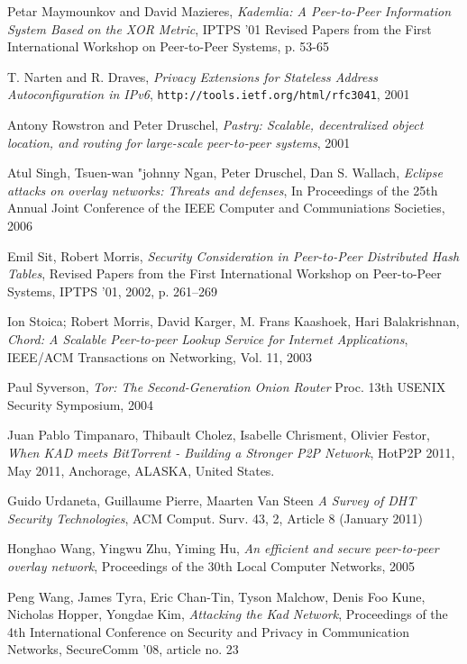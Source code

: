 \begin{thebibliography}{99}
  Petar Maymounkov and David Mazieres,
  \textit{Kademlia: A Peer-to-Peer Information System Based on the XOR Metric},
  IPTPS '01 Revised Papers from the First International Workshop on Peer-to-Peer
  Systems, p. 53-65

  T. Narten and R. Draves,
  \textit{Privacy Extensions for Stateless Address Autoconfiguration in IPv6},
  \texttt{http://tools.ietf.org/html/rfc3041},
  2001

  Antony Rowstron and Peter Druschel,
  \textit{Pastry: Scalable, decentralized object location, and routing for
  large-scale peer-to-peer systems}, 2001

  Atul Singh, Tsuen-wan "johnny Ngan, Peter Druschel, Dan S. Wallach,
  \textit{Eclipse attacks on overlay networks: Threats and defenses},
  In Proceedings of the 25th Annual Joint Conference of the IEEE Computer and
  Communiations Societies, 2006

  Emil Sit, Robert Morris,
  \textit{Security Consideration in Peer-to-Peer Distributed Hash Tables},
  Revised Papers from the First International Workshop on Peer-to-Peer Systems,
  IPTPS '01, 2002, p. 261--269

  Ion Stoica; Robert Morris, David Karger, M. Frans Kaashoek, Hari Balakrishnan,
  \textit{Chord: A Scalable Peer-to-peer Lookup Service for Internet
  Applications},
  IEEE/ACM Transactions on Networking, Vol. 11, 2003

  Paul Syverson,
  \textit{Tor: The Second-Generation Onion Router}
  Proc. 13th USENIX Security Symposium,
  2004

  Juan Pablo Timpanaro, Thibault Cholez, Isabelle Chrisment, Olivier Festor,
  \textit{When KAD meets BitTorrent - Building a Stronger P2P Network},
  HotP2P 2011, May 2011, Anchorage, ALASKA, United States.

 Guido Urdaneta, Guillaume Pierre, Maarten Van Steen
\textit{A Survey of DHT Security Technologies}, ACM Comput. Surv.  43, 2,
Article 8 (January 2011)

  Honghao Wang, Yingwu Zhu, Yiming Hu,
  \textit{An efficient and secure peer-to-peer overlay network}, 
  Proceedings of the 30th Local Computer Networks,
  2005

  Peng Wang, James Tyra, Eric Chan-Tin, Tyson Malchow, Denis Foo Kune, Nicholas
  Hopper, Yongdae Kim,
  \textit{Attacking the Kad Network},
  Proceedings of the 4th International Conference on Security and Privacy in
  Communication Networks, SecureComm '08, article no. 23


\end{thebibliography}
